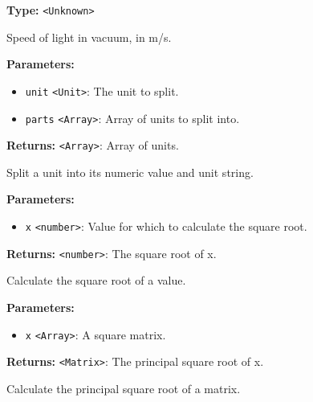 \documentclass[12pt,a4paper]{article}
\begin{document}
\noindent \textbf{Type:} \texttt{<Unknown>}

\noindent Speed of light in vacuum, in m/s.

\vspace{5mm}
\noindent {}


\noindent \textbf{Parameters:}
\begin{itemize}
  \item \texttt{unit} \texttt{<Unit>}: The unit to split.
  \item \texttt{parts} \texttt{<Array>}: Array of units to split into.
\end{itemize}

\noindent \textbf{Returns:} \texttt{<Array>}: Array of units.

\noindent Split a unit into its numeric value and unit string.

\vspace{5mm}
\noindent {}


\noindent \textbf{Parameters:}
\begin{itemize}
  \item \texttt{x} \texttt{<number>}: Value for which to calculate the square root.
\end{itemize}

\noindent \textbf{Returns:} \texttt{<number>}: The square root of x.

\noindent Calculate the square root of a value.

\vspace{5mm}
\noindent {}


\noindent \textbf{Parameters:}
\begin{itemize}
  \item \texttt{x} \texttt{<Array>}: A square matrix.
\end{itemize}

\noindent \textbf{Returns:} \texttt{<Matrix>}: The principal square root of x.

\noindent Calculate the principal square root of a matrix.

\vspace{5mm}
\noindent {}
\end{document}
